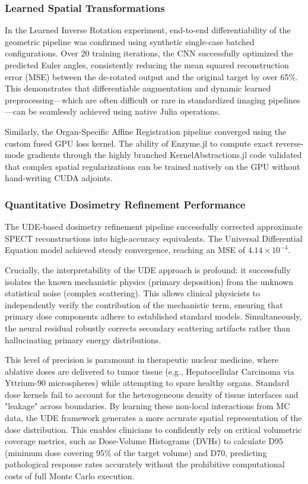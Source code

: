 \documentclass[10pt,letterpaper]{article}
\begin{document}
\subsubsection*{Learned Spatial Transformations}
In the Learned Inverse Rotation experiment, end-to-end differentiability of the geometric pipeline was confirmed using synthetic single-case batched configurations. Over 20 training iterations, the CNN successfully optimized the predicted Euler angles, consistently reducing the mean squared reconstruction error (MSE) between the de-rotated output and the original target by over 65\%. This demonstrates that differentiable augmentation and dynamic learned preprocessing---which are often difficult or rare in standardized imaging pipelines \cite{Shi_2023}---can be seamlessly achieved using native Julia operations.

Similarly, the Organ-Specific Affine Registration pipeline converged using the custom fused GPU loss kernel. The ability of Enzyme.jl to compute exact reverse-mode gradients through the highly branched KernelAbstractions.jl code validated that complex spatial regularizations can be trained natively on the GPU without hand-writing CUDA adjoints.

\subsubsection*{Quantitative Dosimetry Refinement Performance}
The UDE-based dosimetry refinement pipeline successfully corrected approximate SPECT reconstructions into high-accuracy equivalents. The Universal Differential Equation model achieved steady convergence, reaching an MSE of $4.14 \times 10^{-4}$. 

Crucially, the interpretability of the UDE approach is profound: it successfully isolates the known mechanistic physics (primary deposition) from the unknown statistical noise (complex scattering). This allows clinical physicists to independently verify the contribution of the mechanistic term, ensuring that primary dose components adhere to established standard models. Simultaneously, the neural residual robustly corrects secondary scattering artifacts rather than hallucinating primary energy distributions. 

This level of precision is paramount in therapeutic nuclear medicine, where ablative doses are delivered to tumor tissue (e.g., Hepatocellular Carcinoma via Yttrium-90 microspheres) while attempting to spare healthy organs. Standard dose kernels fail to account for the heterogeneous density of tissue interfaces and "leakage" across boundaries. By learning these non-local interactions from MC data, the UDE framework generates a more accurate spatial representation of the dose distribution. This enables clinicians to confidently rely on critical volumetric coverage metrics, such as Dose-Volume Histograms (DVHs) to calculate D95 (minimum dose covering 95\% of the target volume) and D70, predicting pathological response rates accurately without the prohibitive computational costs of full Monte Carlo execution.
\end{document}
